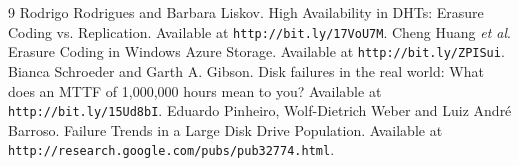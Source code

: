 \begin{thebibliography}{9}
 Rodrigo Rodrigues and Barbara Liskov. High Availability in DHTs: Erasure Coding vs. Replication. Available at \texttt{http://bit.ly/17VoU7M}.
 Cheng Huang \emph{et al}. Erasure Coding in Windows Azure Storage. Available at \texttt{http://bit.ly/ZPISui}.
 Bianca Schroeder and Garth A. Gibson. Disk failures in the real world: What does an MTTF of 1,000,000 hours mean to you? Available at \texttt{http://bit.ly/15Ud8bI}.
 Eduardo Pinheiro, Wolf-Dietrich Weber and Luiz Andr\'{e} Barroso. Failure Trends in a Large Disk Drive Population. Available at \texttt{http://research.google.com/pubs/pub32774.html}.

\end{thebibliography}

